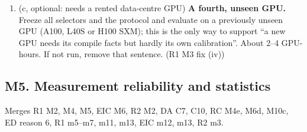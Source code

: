 \documentclass[11pt]{article}
\begin{document}
\begin{enumerate}[label=M4\alph*.]
        the resource report, calibrate at about twelve keys, terms fixed
        before seeing the target calls) to an independently written Triton
        kernel whose registers and spills vary with the chunk, e.g.\ FLA's
        \texttt{chunk\_fwd\_o} or the SSD \texttt{chunk\_scan} kernel with the
        inner tile fixed. About 4--8 GPU-hours. If not run, keep the
        single-kernel case-study scoping (main.tex:406--414, 501--506).
        (R2 M3(e); EIC M4 fix (a); DA C4)
  \item (c, optional: needs a rented data-centre GPU) \textbf{A fourth,
        unseen GPU.} Freeze all selectors and the protocol and evaluate on a
        previously unseen GPU (A100, L40S or H100 SXM); this is the only way to
        support ``a new GPU needs its compile facts but hardly its own
        calibration''. About 2--4 GPU-hours. If not run, remove that sentence.
        (R1 M3 fix (iv))
\end{enumerate}

\subsection*{M5. Measurement reliability and statistics}
Merges R1 M2, M4, M5, EIC M6, R2 M2, DA C7, C10, RC M4e, M6d, M10c, ED reason
6, R1 m5--m7, m11, m13, EIC m12, m13, R2 m3.
\end{document}
